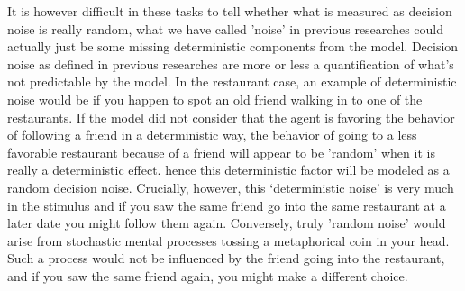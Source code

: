 \documentclass[12pt]{article}
\begin{document}
	It is however difficult in these tasks to tell whether what is measured as decision noise is really random, what we have called 'noise' in previous researches could actually just be some missing deterministic components from the model. Decision noise as defined in previous researches are more or less a quantification of what's not predictable by the model. In the restaurant case, an example of deterministic noise would be if you happen to spot an old friend walking in to one of the restaurants. If the model did not consider that the agent is favoring the behavior of following a friend in a deterministic way, the behavior of going to a less favorable restaurant because of a friend will appear to be 'random' when it is really a deterministic effect. hence this deterministic factor will be modeled as a random decision noise. Crucially, however, this `deterministic noise' is very much in the stimulus and if you saw the same friend go into the same restaurant at a later date you might follow them again. Conversely, truly 'random noise' would arise from stochastic mental processes tossing a metaphorical coin in your head. Such a process would not be influenced by the friend going into the restaurant, and if you saw the same friend again, you might make a different choice. 
	



\end{document}

